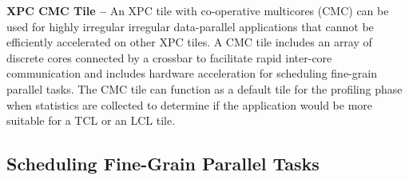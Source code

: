 
\textbf{XPC CMC Tile --} An XPC tile with co-operative multicores (CMC)
can be used for highly irregular irregular data-parallel applications
that cannot be efficiently accelerated on other XPC tiles. A CMC tile
includes an array of discrete cores connected by a crossbar to facilitate
rapid inter-core communication and includes hardware acceleration for
scheduling fine-grain parallel tasks. The CMC tile can function as a
default tile for the profiling phase when statistics are collected to
determine if the application would be more suitable for a TCL or an LCL
tile.



\subsection{Scheduling Fine-Grain Parallel Tasks}

%    
%    


